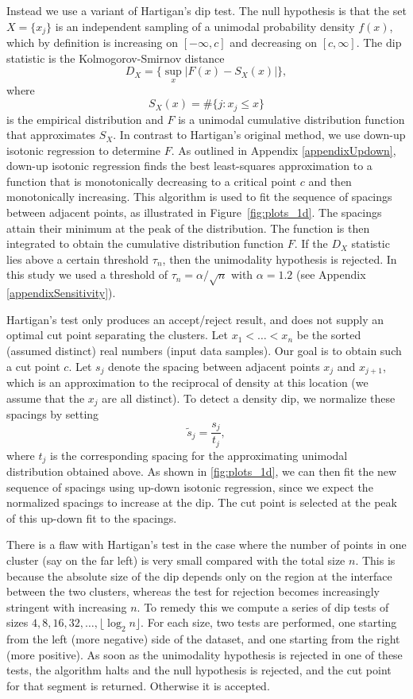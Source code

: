 \documentclass[10pt]{article}
\begin{document}
Instead we use a variant of Hartigan's dip test. The null hypothesis is that the set $X=\{x_j\}$ is an independent sampling of a unimodal probability density $f(x)$, which by definition is increasing on $[-\infty,c]$ and decreasing on $[c,\infty]$. The dip statistic is the Kolmogorov-Smirnov distance
$$D_X = \{\sup_x |F(x)-S_X(x)|\},$$
where
$$S_X(x)=\#\{j:x_j\leq x\}$$
is the empirical distribution and $F$ is a unimodal cumulative distribution function that approximates $S_X$. In contrast to Hartigan's original method, we use down-up isotonic regression to determine $F$. As outlined in Appendix \ref{appendixUpdown}, down-up isotonic regression finds the best least-squares approximation to a function that is monotonically decreasing to a critical point $c$ and then monotonically increasing. This algorithm is used to fit the sequence of spacings between adjacent points, as illustrated in Figure~\ref{fig:plots_1d}. The spacings attain their minimum at the peak of the distribution. The function is then integrated to obtain the cumulative distribution function $F$. If the $D_X$ statistic lies above a certain threshold $\tau_{n}$, then the unimodality hypothesis is rejected. In this study we used a threshold of $\tau_{n}=\alpha/\sqrt{n}$ with $\alpha=1.2$ (see Appendix \ref{appendixSensitivity}).

Hartigan's test only produces an accept/reject result, and does not supply an optimal cut point separating the clusters. Let $x_1<\dots<x_n$ be the sorted (assumed distinct) real numbers (input data samples). Our goal is to obtain such a cut point $c$. Let $s_j$ denote the spacing between adjacent points $x_j$ and $x_{j+1}$, which is an approximation to the reciprocal of density at this location (we assume that the $x_j$ are all distinct). To detect a density dip, we normalize these spacings by setting 
$$\tilde{s}_j=\frac{s_j}{t_j},$$
where $t_j$ is the corresponding spacing for the approximating unimodal distribution obtained above. As shown in \ref{fig:plots_1d}, we can then fit the new sequence of spacings using up-down isotonic regression, since we expect the normalized spacings to increase at the dip. The cut point is selected at the peak of this up-down fit to the spacings. 

There is a flaw with Hartigan's test in the case where the number of points in one cluster (say on the far left) is very small compared with the total size $n$. This is because the absolute size of the dip depends only on the region at the interface between the two clusters, whereas the test for rejection becomes increasingly stringent with increasing $n$. To remedy this we compute a series of dip tests of sizes $4,8,16,32,\dots,\lfloor\log_2 n\rfloor$. For each size, two tests are performed, one starting from the left (more negative) side of the dataset, and one starting from the right (more positive). As soon as the unimodality hypothesis is rejected in one of these tests, the algorithm halts and the null hypothesis is rejected, and the cut point for that segment is returned. Otherwise it is accepted.
\end{document}
